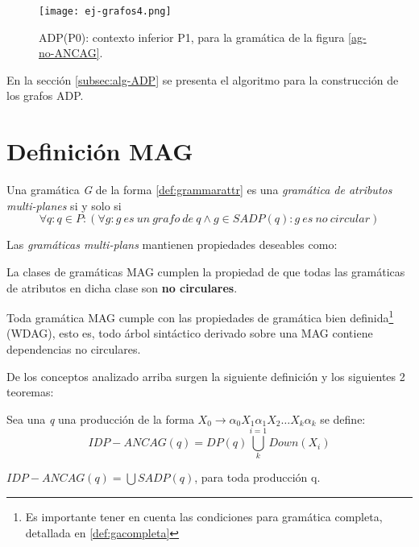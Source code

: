 \begin{figure}\centering
 \texttt{[image: ej-grafos4.png]}
\caption{\label{adp-wuu-yang} ADP(P0): contexto inferior P1, para la gramática de la figura \ref{ag-no-ANCAG}.}
\end{figure}

En la sección \ref{subsec:alg-ADP} se presenta el algoritmo para la construcción de los grafos ADP.

\section{Definición MAG}
\label{def:MAG}
Una gramática \textit{G} de la forma \ref{def:grammarattr} es una \textit{gramática de atributos multi-planes} si y solo si 
\begin{equation}
\forall q : q \in P: (\forall g:g\ es\ un\ grafo\ de\ q \wedge g \in SADP(q) : g\ es\ no\ circular) 
\end{equation}

Las \textit{gramáticas multi-plans} mantienen propiedades deseables como:
\begin{items}
\item La clases de gramáticas MAG cumplen la propiedad de que todas las gramáticas de atributos en dicha clase son \textbf{no circulares}.
\item Toda gramática MAG cumple con las propiedades de gramática bien definida\footnote{Es importante tener en cuenta las condiciones para gramática completa, detallada en \ref{def:gacompleta}} (WDAG), esto es, todo árbol sintáctico derivado sobre una MAG contiene dependencias no circulares.
\end{items}

De los conceptos analizado arriba surgen la siguiente definición y los siguientes 2 teoremas:

\begin{definition}
\label{def:ancag}
 Sea una \textit{q} una producción de la forma $X_{0}\rightarrow \alpha_{0} X_{1} \alpha_{1} X_{2} \dots X_{k} \alpha_{k}$ se define:
\begin{equation}
 IDP-ANCAG(q) = DP(q) \bigcup\limits_{k}^{i=1}{Down(X_{i})}
\end{equation}

\end{definition}

\begin{theorem}
\label{th:ancag1}
$IDP-ANCAG(q) = \bigcup SADP(q)$, para toda producción q. 
\end{theorem}

